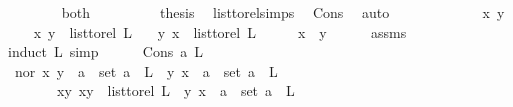 \begin{isabellebody}
\isanewline
\ \ \ \ \ \ \isamarkupfalse%
\ both\isanewline
\ \ \ \ \ \ \isamarkupfalse%
\ \isamarkupfalse%
\ {\isacharquery}{\kern0pt}thesis\ \isamarkupfalse%
\ list{\isacharunderscore}{\kern0pt}to{\isacharunderscore}{\kern0pt}rel{\isachardot}{\kern0pt}simps{\isacharparenleft}{\kern0pt}{}{\isacharparenright}{\kern0pt}\ \isamarkupfalse%
\ Cons\ \isamarkupfalse%
\ auto\isanewline
\ \ \ \ \isamarkupfalse%
\isanewline
\ \ \isamarkupfalse%
\ \isanewline
{}\isamarkupfalse%
\isanewline
\ \ \isamarkupfalse%
\ x\ y\ \isanewline
\ \ \isamarkupfalse%
\ {\isachardoublequoteopen}{\isacharparenleft}{\kern0pt}x{\isacharcomma}{\kern0pt}\ y{\isacharparenright}{\kern0pt}\ {\isasymin}\ list{\isacharunderscore}{\kern0pt}to{\isacharunderscore}{\kern0pt}rel\ L{\isachardoublequoteclose}\isanewline
\ \ \ {\isachardoublequoteopen}{\isacharparenleft}{\kern0pt}y{\isacharcomma}{\kern0pt}\ x{\isacharparenright}{\kern0pt}\ {\isasymin}\ list{\isacharunderscore}{\kern0pt}to{\isacharunderscore}{\kern0pt}rel\ L{\isachardoublequoteclose}\isanewline
\ \ \isamarkupfalse%
\ \isamarkupfalse%
\ {\isachardoublequoteopen}x\ {\isacharequal}{\kern0pt}\ y{\isachardoublequoteclose}\isanewline
\ \ \ \ \isamarkupfalse%
\ assms\isanewline
\ \ \isamarkupfalse%
{\isacharparenleft}{\kern0pt}induct\ L{\isacharcomma}{\kern0pt}\ simp{\isacharparenright}{\kern0pt}\isanewline
\ \ \ \ \isamarkupfalse%
\ {\isacharparenleft}{\kern0pt}Cons\ a\ L{\isacharparenright}{\kern0pt}\isanewline
\ \ \ \ \ \ \isamarkupfalse%
\ \isamarkupfalse%
\ {\isacharparenleft}{\kern0pt}nor{\isacharparenright}{\kern0pt}\ {\isachardoublequoteopen}{\isacharparenleft}{\kern0pt}x{\isacharcomma}{\kern0pt}\ y{\isacharparenright}{\kern0pt}\ {\isasymin}\ {\isacharbraceleft}{\kern0pt}a{\isacharbraceright}{\kern0pt}\ {\isasymtimes}\ set\ {\isacharparenleft}{\kern0pt}a\ {\isacharhash}{\kern0pt}\ L{\isacharparenright}{\kern0pt}\ {\isasymand}\ {\isacharparenleft}{\kern0pt}y{\isacharcomma}{\kern0pt}\ x{\isacharparenright}{\kern0pt}\ {\isasymin}\ {\isacharbraceleft}{\kern0pt}a{\isacharbraceright}{\kern0pt}\ {\isasymtimes}\ set\ {\isacharparenleft}{\kern0pt}a\ {\isacharhash}{\kern0pt}\ L{\isacharparenright}{\kern0pt}{\isachardoublequoteclose}\ \isanewline
\ \ \ \ \ \ {\isacharbar}{\kern0pt}\ {\isacharparenleft}{\kern0pt}xy{\isacharparenright}{\kern0pt}\ {\isachardoublequoteopen}{\isacharparenleft}{\kern0pt}x{\isacharcomma}{\kern0pt}y{\isacharparenright}{\kern0pt}\ {\isasymin}\ list{\isacharunderscore}{\kern0pt}to{\isacharunderscore}{\kern0pt}rel\ L\ {\isasymand}\ {\isacharparenleft}{\kern0pt}y{\isacharcomma}{\kern0pt}\ x{\isacharparenright}{\kern0pt}\ {\isasymin}\ {\isacharbraceleft}{\kern0pt}a{\isacharbraceright}{\kern0pt}\ {\isasymtimes}\ set\ {\isacharparenleft}{\kern0pt}a\ {\isacharhash}{\kern0pt}\ L{\isacharparenright}{\kern0pt}{\isachardoublequoteclose}\ \isanewline

\end{isabellebody}
